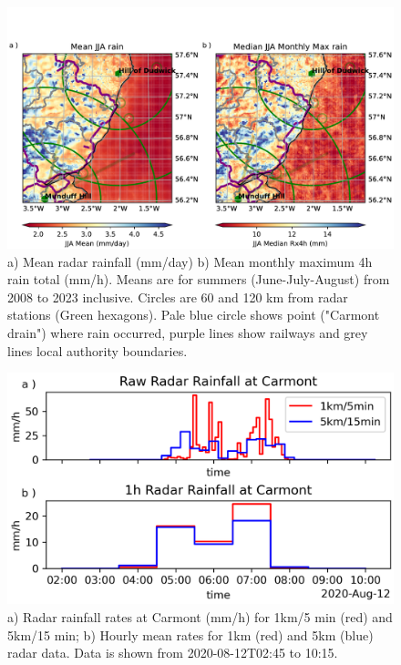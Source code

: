 \documentclass[11pt,a4paper]{article}
\begin{document}
\begin{figure}
	\centering
	\includegraphics[width=\linewidth]{radar_jja}
	\caption{a) Mean radar rainfall (mm/day) b) Mean monthly maximum 4h rain total (mm/h). Means are for summers (June-July-August) from 2008 to 2023 inclusive. Circles are  60 and 120 km from radar stations (Green hexagons). Pale blue circle shows point ("Carmont drain") where rain occurred, purple lines show railways and grey lines local authority boundaries. }
\end{figure}
\begin{figure}[tp]
	\centering
	\includegraphics[width=0.5\linewidth]{radar_carmont.png}
	\caption{a) Radar rainfall rates at Carmont (mm/h) for 1km/5 min (red) and 5km/15 min; b) Hourly mean rates for 1km (red) and 5km (blue) radar data. Data is shown from 2020-08-12T02:45 to 10:15. }
	\label{fig:mean_rain}
\end{figure}
\end{document}
